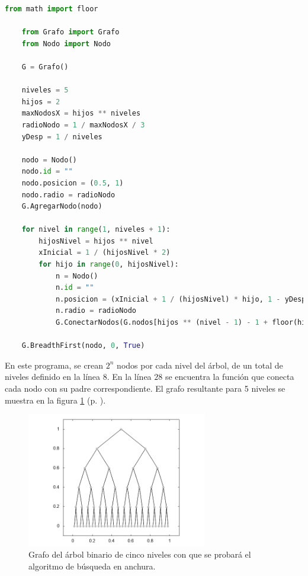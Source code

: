\documentclass{article}
\begin{document}
  \begin{lstlisting}[language=Python]
    from math import floor

    from Grafo import Grafo
    from Nodo import Nodo

    G = Grafo()

    niveles = 5
    hijos = 2
    maxNodosX = hijos ** niveles
    radioNodo = 1 / maxNodosX / 3
    yDesp = 1 / niveles

    nodo = Nodo()
    nodo.id = ""
    nodo.posicion = (0.5, 1)
    nodo.radio = radioNodo
    G.AgregarNodo(nodo)

    for nivel in range(1, niveles + 1):
        hijosNivel = hijos ** nivel
        xInicial = 1 / (hijosNivel * 2)
        for hijo in range(0, hijosNivel):
            n = Nodo()
            n.id = ""
            n.posicion = (xInicial + 1 / (hijosNivel) * hijo, 1 - yDesp * nivel)
            n.radio = radioNodo
            G.ConectarNodos(G.nodos[hijos ** (nivel - 1) - 1 + floor(hijo / hijos)], n)

    G.BreadthFirst(nodo, 0, True)
  \end{lstlisting}

  En este programa, se crean $2^n$ nodos por cada nivel del árbol, de un total de niveles definido en la línea $8$. En la línea $28$ se encuentra la función que conecta cada nodo con su padre correspondiente. El grafo resultante para 5 niveles se muestra en la figura \ref{arbolBinario} (p. \pageref{arbolBinario}).

  \begin{figure}[h]
    \includegraphics[width=0.7\textwidth]{arbolBinario}
    \centering
    \caption{Grafo del árbol binario de cinco niveles con que se probará el algoritmo de búsqueda en anchura.}
    \label{arbolBinario}
  \end{figure}
\end{document}
